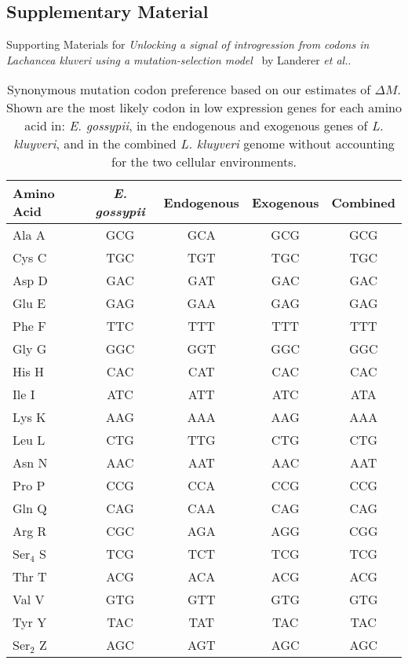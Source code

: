 \documentclass{bmcart}
\newcommand\suppl{\par
  \setcounter{section}{0}%
  \setcounter{subsection}{0}%
  \setcounter{table}{0}%
  \setcounter{figure}{0}%
  \setcounter{equation}{0}%
  \gdef\thesection{\Alph{section}.1}%
  \def\thefigure{\Alph{section}\arabic{figure}}%
  \def\thetable{\Alph{section}\arabic{table}}%
  \def\theequation {\Alph{section}\arabic{equation}}}
\newcommand{\kluyveri}{\textit{L. kluyveri}\xspace}
\newcommand{\gossypii}{\textit{E. gossypii}\xspace}
\newcommand{\DM}{\ensuremath{{\Delta M}}\xspace}
\begin{document}
\begin{backmatter}
 
%



\clearpage
\pagebreak



\suppl

\setcounter{section}{19} %
\setcounter{page}{1}
\renewcommand{\thepage}{S\arabic{page}} %

\section*{Supplementary Material}

Supporting Materials for \emph{Unlocking a signal of introgression from codons in Lachancea kluveri using a mutation-selection model} \ by Landerer \emph{et al.}.

\begin{table}[h]
    \centering
    \caption{Synonymous mutation codon preference based on our estimates of $\DM$.
	 Shown are the most likely codon in low expression genes for each amino acid in: \gossypii, in the endogenous and exogenous genes of \kluyveri, and in the combined \kluyveri genome without accounting for the two cellular environments.}
\begin{tabular}{  l  c  c  c  c  }
\hline
	Amino Acid & \gossypii & Endogenous & Exogenous & Combined \\ \hline
	Ala A & GCG & GCA & GCG & GCG \\ 
	Cys C & TGC & TGT & TGC & TGC \\ 
	Asp D & GAC & GAT & GAC & GAC \\ 
	Glu E & GAG & GAA & GAG & GAG \\ 
	Phe F & TTC & TTT & TTT & TTT \\ 
	Gly G & GGC & GGT & GGC & GGC \\ 
	His H & CAC & CAT & CAC & CAC \\ 
	Ile I & ATC & ATT & ATC & ATA \\ 
	Lys K & AAG & AAA & AAG & AAA \\ 
	Leu L & CTG & TTG & CTG & CTG \\ 
	Asn N & AAC & AAT & AAC & AAT \\ 
	Pro P & CCG & CCA & CCG & CCG \\ 
	Gln Q & CAG & CAA & CAG & CAG \\ 
	Arg R & CGC & AGA & AGG & CGG \\ 
	Ser$_4$ S & TCG & TCT & TCG & TCG \\
	Thr T & ACG & ACA & ACG & ACG \\ 
	Val V & GTG & GTT & GTG & GTG \\ 
	Tyr Y & TAC & TAT & TAC & TAC \\ 
	Ser$_2$ Z & AGC & AGT & AGC & AGC \\ \hline
\end{tabular}
    \label{tab:codon_pref_dm}
\end{table}


\end{backmatter}
\end{document}
